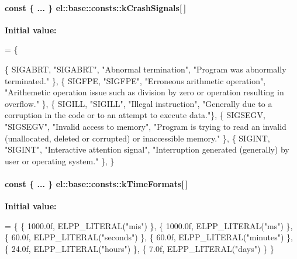 \paragraph[{k\+Crash\+Signals}]{\setlength{\rightskip}{0pt plus 5cm}const \{ ... \}   el\+::base\+::consts\+::k\+Crash\+Signals\mbox{[}$\,$\mbox{]}}\label{a00185_ae148ad63452cb04651a6abe4f6b3f39c}
{\bfseries Initial value\+:}
\begin{DoxyCode}
= \{
        
        \{ SIGABRT, \textcolor{stringliteral}{"SIGABRT"}, \textcolor{stringliteral}{"Abnormal termination"},
                \textcolor{stringliteral}{"Program was abnormally terminated."} \},
        \{ SIGFPE, \textcolor{stringliteral}{"SIGFPE"}, \textcolor{stringliteral}{"Erroneous arithmetic operation"},
                \textcolor{stringliteral}{"Arithemetic operation issue such as division by zero or operation resulting in overflow."} 
      \},
        \{ SIGILL, \textcolor{stringliteral}{"SIGILL"}, \textcolor{stringliteral}{"Illegal instruction"},
                \textcolor{stringliteral}{"Generally due to a corruption in the code or to an attempt to execute data."}\},
        \{ SIGSEGV, \textcolor{stringliteral}{"SIGSEGV"}, \textcolor{stringliteral}{"Invalid access to memory"},
                \textcolor{stringliteral}{"Program is trying to read an invalid (unallocated, deleted or corrupted) or inaccessible
       memory."} \},
        \{ SIGINT, \textcolor{stringliteral}{"SIGINT"}, \textcolor{stringliteral}{"Interactive attention signal"},
                 \textcolor{stringliteral}{"Interruption generated (generally) by user or operating system."} \},
    \}
\end{DoxyCode}
\hypertarget{a00185_aebf5600a219b9313965789b468416edd}{}
\paragraph[{k\+Time\+Formats}]{\setlength{\rightskip}{0pt plus 5cm}const \{ ... \}   el\+::base\+::consts\+::k\+Time\+Formats\mbox{[}$\,$\mbox{]}}\label{a00185_aebf5600a219b9313965789b468416edd}
{\bfseries Initial value\+:}
\begin{DoxyCode}
= \{
       \{ 1000.0f, ELPP\_LITERAL(\textcolor{stringliteral}{"mis"}) \},
       \{ 1000.0f, ELPP\_LITERAL(\textcolor{stringliteral}{"ms"}) \},
       \{ 60.0f, ELPP\_LITERAL(\textcolor{stringliteral}{"seconds"}) \},
       \{ 60.0f, ELPP\_LITERAL(\textcolor{stringliteral}{"minutes"}) \},
       \{ 24.0f, ELPP\_LITERAL(\textcolor{stringliteral}{"hours"}) \},
       \{ 7.0f, ELPP\_LITERAL(\textcolor{stringliteral}{"days"}) \}
    \}
\end{DoxyCode}
